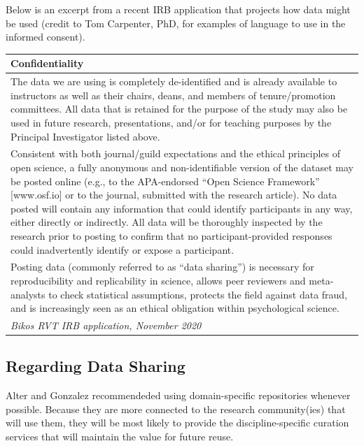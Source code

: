 \documentclass[
  english,
]{book}
\begin{document}
Below is an excerpt from a recent IRB application that projects how data might be used (credit to Tom Carpenter, PhD, for examples of language to use in the informed consent).

\begin{longtable}[]{@{}
  >{\raggedright\arraybackslash}p{}@{}}
\toprule
Confidentiality \\
\midrule
\endhead
The data we are using is completely de-identified and is already available to instructors as well as their chairs, deans, and members of tenure/promotion committees. All data that is retained for the purpose of the study may also be used in future research, presentations, and/or for teaching purposes by the Principal Investigator listed above. \\
Consistent with both journal/guild expectations and the ethical principles of open science, a fully anonymous and non-identifiable version of the dataset may be posted online (e.g., to the APA-endorsed ``Open Science Framework'' {[}www.osf.io{]} or to the journal, submitted with the research article). No data posted will contain any information that could identify participants in any way, either directly or indirectly. All data will be thoroughly inspected by the research prior to posting to confirm that no participant-provided responses could inadvertently identify or expose a participant. \\
Posting data (commonly referred to as ``data sharing'') is necessary for reproducibility and replicability in science, allows peer reviewers and meta-analysts to check statistical assumptions, protects the field against data fraud, and is increasingly seen as an ethical obligation within psychological science. \\
\emph{Bikos RVT IRB application, November 2020} \\
\bottomrule
\end{longtable}

\hypertarget{regarding-data-sharing}{%
\subsection{Regarding Data Sharing}\label{regarding-data-sharing}}

Alter and Gonzalez \citeyearpar{alter_responsible_2018} recommendeded using domain-specific repositories whenever possible. Because they are more connected to the research community(ies) that will use them, they will be most likely to provide the discipline-specific curation services that will maintain the value for future reuse.
\end{document}
